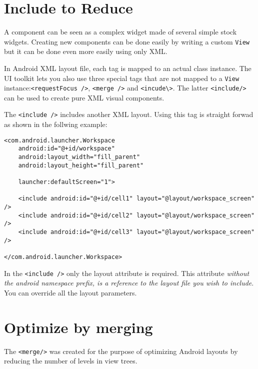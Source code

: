 \documentclass[11pt, a4paper]{book}
\begin{document}
\section{Include to Reduce}
A component can be seen as a complex widget made of several simple stock
widgets. Creating new components can be done easily by writing a custom
\verb|View| but it can be done even more easily using only XML.

In Android XML layout file, each tag is mapped to an actual class instance. The
UI toolkit lets you also use three special tags that are not mapped to a 
\verb|View| instance:\verb|<requestFocus />|, \verb|<merge />| and
\verb|<incude\>|. The latter \verb|<include/>| can be used to create pure XML
visual components.

The \verb|<include />| includes another XML layout. Using this tag is straight
forwad as shown in the follwing example:
\begin{verbatim}
<com.android.launcher.Workspace
    android:id="@+id/workspace"
    android:layout_width="fill_parent"
    android:layout_height="fill_parent"

    launcher:defaultScreen="1">

    <include android:id="@+id/cell1" layout="@layout/workspace_screen" />
    <include android:id="@+id/cell2" layout="@layout/workspace_screen" />
    <include android:id="@+id/cell3" layout="@layout/workspace_screen" />

</com.android.launcher.Workspace>
\end{verbatim}

In the \verb|<include />| only the layout attribute is required. This attribute
\emph{without the android namespace prefix, is a reference to the layout file
you wish to include}. You can override all the layout parameters.



\section{Optimize by merging}
The \verb|<merge/>| was created for the purpose of optimizing Android layouts by
reducing the number of levels in view trees. 
\end{document}
